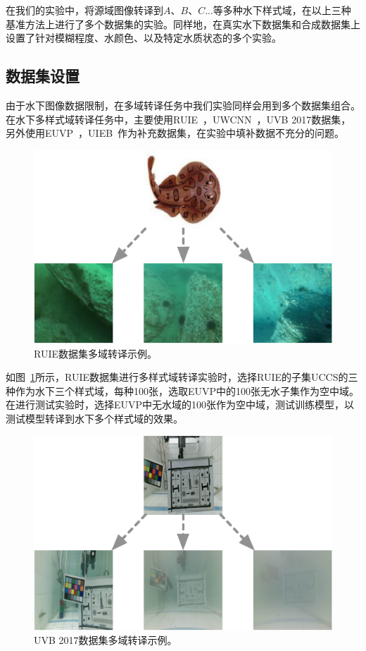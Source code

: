 在我们的实验中，将源域图像转译到$A$、$B$、$C$...等多种水下样式域，在以上三种基准方法上进行了多个数据集的实验。同样地，在真实水下数据集和合成数据集上设置了针对模糊程度、水颜色、以及特定水质状态的多个实验。

\subsection{数据集设置}
由于水下图像数据限制，在多域转译任务中我们实验同样会用到多个数据集组合。在水下多样式域转译任务中，主要使用RUIE~\cite{liu2019real}，UWCNN~\cite{li2020underwater}，UVB 2017数据集，另外使用EUVP~\cite{islam2019fast}，UIEB~\cite{li2019underwater}作为补充数据集，在实验中填补数据不充分的问题。

\begin{figure}[ht]
    \centering
  \includegraphics[width=\textwidth]{figures/RUIE_dataset_domain.pdf}
  \caption{RUIE数据集多域转译示例。}
  \label{fig:ruie_domain}
\end{figure}

如图~\ref{fig:ruie_domain}所示，RUIE数据集进行多样式域转译实验时，选择RUIE的子集UCCS的三种作为水下三个样式域，每种100张，选取EUVP中的100张无水子集作为空中域。在进行测试实验时，选择EUVP中无水域的100张作为空中域，测试训练模型，以测试模型转译到水下多个样式域的效果。

\begin{figure}[ht]
    \centering
  \includegraphics[width=\textwidth]{figures/UVB_dataset_domain.pdf}
  \caption{UVB 2017数据集多域转译示例。}
  \label{fig:uvb_domain}
\end{figure}


